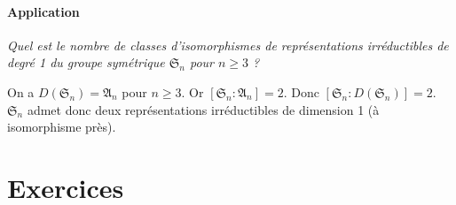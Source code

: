 \documentclass[french]{book}
\theoremstyle{definition}
\begin{document}
\paragraph{Application}

\emph{Quel est le nombre de classes d'isomorphismes de représentations irréductibles de degré 1 du groupe symétrique \(\mathfrak{S}_n\) pour \(n \geq 3\) ?}

On a \(D(\mathfrak{S}_n) = \mathfrak{A}_n\) pour \(n \geq 3\). Or \([\mathfrak{S}_n : \mathfrak{A}_n] = 2\). Donc \([\mathfrak{S}_n : D(\mathfrak{S}_n)]= 2\). \(\mathfrak{S}_n\) admet donc deux représentations irréductibles de dimension 1 (à isomorphisme près).

\section*{Exercices}
\end{document}
